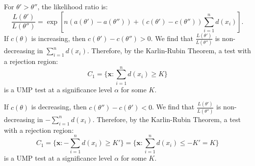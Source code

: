 \documentclass{huhtakm-template-book-v2}
\begin{document}
    \begin{proofing}
        For $\theta'>\theta''$, the likelihood ratio is:
        \begin{equation*}
            \frac{L(\theta')}{L(\theta'')}=\exp\left[n(a(\theta')-a(\theta''))+(c(\theta')-c(\theta''))\sum_{i=1}^{n}d(x_{i})\right].
        \end{equation*}
        If $c(\theta)$ is increasing, then $c(\theta')-c(\theta'')>0$. We find that $\frac{L(\theta')}{L(\theta'')}$ is non-decreasing in $\sum_{i=1}^{n}d(x_{i})$. Therefore, by the Karlin-Rubin Theorem, a test with a rejection region:
        \begin{equation*}
            C_{1}=\biggl\{\mathbf{x}:\sum_{i=1}^{n}d(x_{i})\geq K\biggr\}
        \end{equation*}
        is a UMP test at a significance level $\alpha$ for some $K$.
        
        If $c(\theta)$ is decreasing, then $c(\theta'')-c(\theta')<0$. We find that $\frac{L(\theta')}{L(\theta'')}$ is non-decreasing in $-\sum_{i=1}^{n}d(x_{i})$. Therefore, by the Karlin-Rubin Theorem, a test with a rejection region:
        \begin{equation*}
            C_{1}=\biggl\{\mathbf{x}:-\sum_{i=1}^{n}d(x_{i})\geq K'\biggr\}=\biggl\{\mathbf{x}:\sum_{i=1}^{n}d(x_{i})\leq -K'=K\biggr\}
        \end{equation*}
        is a UMP test at a significance level $\alpha$ for some $K$.
    \end{proofing}
\end{document}
